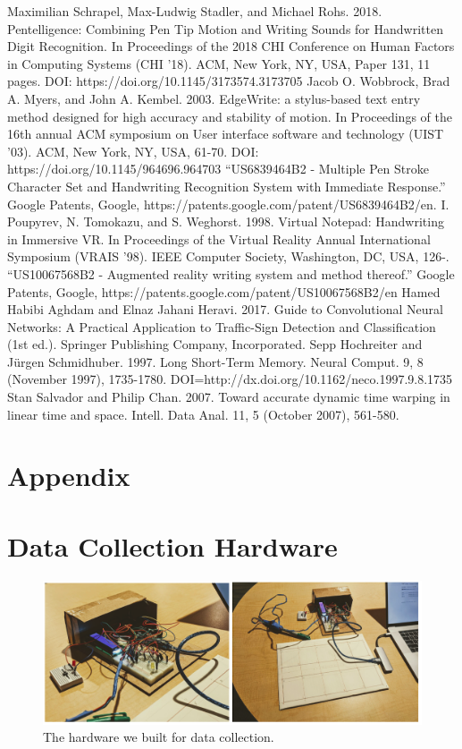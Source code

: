 \documentclass{article}
\begin{document}
  

\begin{thebibliography}{1}
     Maximilian Schrapel, Max-Ludwig Stadler, and Michael Rohs. 2018. Pentelligence: Combining Pen Tip Motion and Writing Sounds for Handwritten Digit Recognition. In Proceedings of the 2018 CHI Conference on Human Factors in Computing Systems (CHI '18). ACM, New York, NY, USA, Paper 131, 11 pages. DOI: https://doi.org/10.1145/3173574.3173705
     Jacob O. Wobbrock, Brad A. Myers, and John A. Kembel. 2003. EdgeWrite: a stylus-based text entry method designed for high accuracy and stability of motion. In Proceedings of the 16th annual ACM symposium on User interface software and technology (UIST '03). ACM, New York, NY, USA, 61-70. DOI: https://doi.org/10.1145/964696.964703 
     “US6839464B2 - Multiple Pen Stroke Character Set and Handwriting Recognition System with Immediate Response.” Google Patents, Google, https://patents.google.com/patent/US6839464B2/en.
      I. Poupyrev, N. Tomokazu, and S. Weghorst. 1998. Virtual Notepad: Handwriting in Immersive VR. In Proceedings of the Virtual Reality Annual International Symposium (VRAIS '98). IEEE Computer Society, Washington, DC, USA, 126-.
     “US10067568B2 - Augmented reality writing system and method thereof.” Google Patents, Google, https://patents.google.com/patent/US10067568B2/en
     Hamed Habibi Aghdam and Elnaz Jahani Heravi. 2017. Guide to Convolutional Neural Networks: A Practical Application to Traffic-Sign Detection and Classification (1st ed.). Springer Publishing Company, Incorporated.
     Sepp Hochreiter and Jürgen Schmidhuber. 1997. Long Short-Term Memory. Neural Comput. 9, 8 (November 1997), 1735-1780. DOI=http://dx.doi.org/10.1162/neco.1997.9.8.1735
     Stan Salvador and Philip Chan. 2007. Toward accurate dynamic time warping in linear time and space. Intell. Data Anal. 11, 5 (October 2007), 561-580.
\end{thebibliography}

\appendix
\section*{Appendix}
\section{Data Collection Hardware} \label{hardware_appendix}
\begin{figure}[ht]
    \centering
    \includegraphics[scale=0.25]{hardware.png}
    \caption{The hardware we built for data collection.}
    \label{fig:hardware}
\end{figure}
\end{document}
